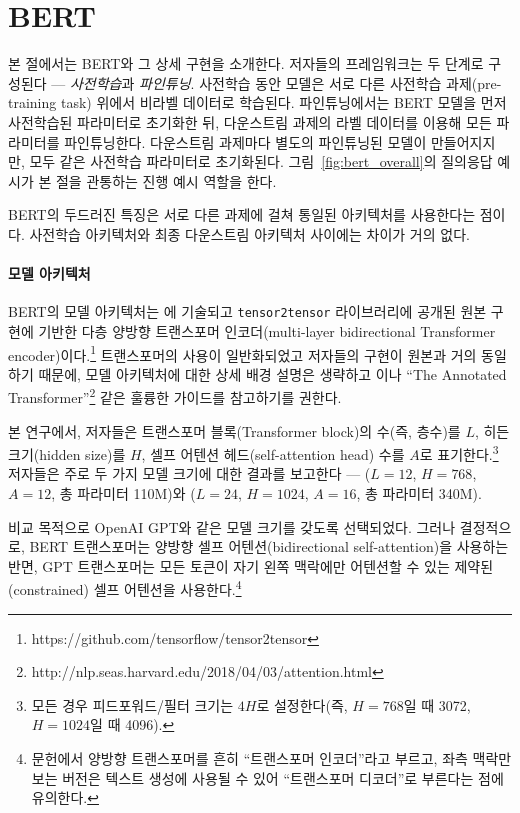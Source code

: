 


\section{BERT}
\label{sec:bert}

본 절에서는 BERT와 그 상세 구현을 소개한다. 저자들의 프레임워크는 두 단계로 구성된다 — \emph{사전학습}과 \emph{파인튜닝}.
사전학습 동안 모델은 서로 다른 사전학습 과제(pre-training task) 위에서 비라벨 데이터로 학습된다.
파인튜닝에서는 BERT 모델을 먼저 사전학습된 파라미터로 초기화한 뒤, 다운스트림 과제의 라벨 데이터를 이용해 모든 파라미터를 파인튜닝한다.
다운스트림 과제마다 별도의 파인튜닝된 모델이 만들어지지만, 모두 같은 사전학습 파라미터로 초기화된다. 그림~\ref{fig:bert_overall}의 질의응답 예시가 본 절을 관통하는 진행 예시 역할을 한다.

BERT의 두드러진 특징은 서로 다른 과제에 걸쳐 통일된 아키텍처를 사용한다는 점이다.
사전학습 아키텍처와 최종 다운스트림 아키텍처 사이에는 차이가 거의 없다.

\paragraph{모델 아키텍처}
BERT의 모델 아키텍처는 \citet{vaswani-etal:2017:_atten}에 기술되고 {\tt tensor2tensor} 라이브러리에 공개된 원본 구현에 기반한 다층 양방향 트랜스포머 인코더(multi-layer bidirectional Transformer encoder)이다.\footnote{https://github.com/tensorflow/tensor2tensor} 트랜스포머의 사용이 일반화되었고 저자들의 구현이 원본과 거의 동일하기 때문에, 모델 아키텍처에 대한 상세 배경 설명은 생략하고 \citet{vaswani-etal:2017:_atten}이나 ``The Annotated Transformer''\footnote{http://nlp.seas.harvard.edu/2018/04/03/attention.html} 같은 훌륭한 가이드를 참고하기를 권한다.

본 연구에서, 저자들은 트랜스포머 블록(Transformer block)의 수(즉, 층수)를 $L$, 히든 크기(hidden size)를 $H$, 셀프 어텐션 헤드(self-attention head) 수를 $A$로 표기한다.\footnote{모든 경우 피드포워드/필터 크기는 $4H$로 설정한다(즉, $H=768$일 때 3072, $H=1024$일 때 4096).} 저자들은 주로 두 가지 모델 크기에 대한 결과를 보고한다 — {\bf \bertbase} ($L=12$, $H=768$, $A=12$, 총 파라미터 110M)와 {\bf \bertlarge} ($L=24$, $H=1024$, $A=16$, 총 파라미터 340M).

 비교 목적으로 OpenAI GPT와 같은 모델 크기를 갖도록 선택되었다. 그러나 결정적으로, BERT 트랜스포머는 양방향 셀프 어텐션(bidirectional self-attention)을 사용하는 반면, GPT 트랜스포머는 모든 토큰이 자기 왼쪽 맥락에만 어텐션할 수 있는 제약된(constrained) 셀프 어텐션을 사용한다.\footnote{문헌에서 양방향 트랜스포머를 흔히 ``트랜스포머 인코더''라고 부르고, 좌측 맥락만 보는 버전은 텍스트 생성에 사용될 수 있어 ``트랜스포머 디코더''로 부른다는 점에 유의한다.}


